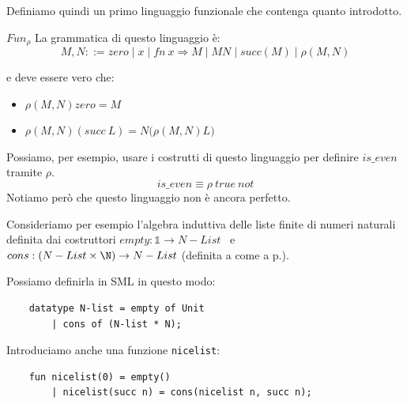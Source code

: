 \documentclass[a4paper,11pt]{report}
\begin{document}
\vspace{1em}
Definiamo quindi un primo linguaggio funzionale che contenga quanto introdotto.

\begin{defframe}{\( Fun_{\rho} \)}{}
    La grammatica di questo linguaggio è:
        \[
        M, N ::= zero \mid x \mid fn \ x \Rightarrow M \mid MN \mid succ(M) \mid \rho(M, N)
    \]

    e deve essere vero che:
    \begin{itemize}
        \item \( \rho(M, N)zero = M \) 
        \item \( \rho(M, N)(succ \ L) = N\bigl(\rho(M, N)L\bigr) \)  

    \end{itemize}
\end{defframe}

Possiamo, per esempio, usare i costrutti di questo linguaggio per definire \( is\_even \) tramite \( \rho \).
\[ is\_even \equiv \rho \ true \ not \]
Notiamo però che questo linguaggio non è ancora perfetto.

Consideriamo per esempio l'algebra induttiva delle liste finite di numeri naturali definita dai costruttori \( empty: \mathbb{1}\to N-List \) \ e \ \( cons: (N-List \times \N) \to N-List \) (definita a come a p.\pageref{alist}).

Possiamo definirla in SML in questo modo:
\begin{lstlisting}
    datatype N-list = empty of Unit 
        | cons of (N-list * N);
\end{lstlisting}

Introduciamo anche una funzione \texttt{nicelist}:
\begin{lstlisting}
    fun nicelist(0) = empty()
        | nicelist(succ n) = cons(nicelist n, succ n);
\end{lstlisting}
\end{document}
